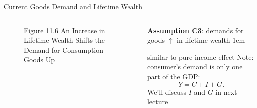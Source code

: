 \documentclass[11pt,aspectratio=43]{beamer}
\let\olditemize=\itemize
\let\endolditemize=\enditemize
\renewenvironment{itemize}{\olditemize \itemsep1em}{\endolditemize}
\theoremstyle{definition}
\begin{document}
\begin{frame}{Current Goods Demand and Lifetime Wealth}
\label{slide:Current_Goods_Demand_and_Lifetime_Wealth}
    \begin{columns}
        \begin{column}{0.5\textwidth}
            \begin{figure}
                \caption{\scriptsize Figure 11.6  An Increase in Lifetime Wealth Shifts the Demand for Consumption Goods Up}
            \end{figure}
        \end{column}
        \begin{column}{0.5\textwidth}
            \textbf{Assumption C3}: demands for goods $ \uparrow  $ in lifetime wealth
            \begin{itemize}
                \item similar to pure income effect
            \end{itemize}
            Note: consumer's demand is only one part of the GDP:
            \begin{equation*}
               Y = C + I + G
            .\end{equation*}
            We'll discuss $ I $ and $ G $ in next lecture

        \end{column}
    \end{columns}
\end{frame}
\end{document}
